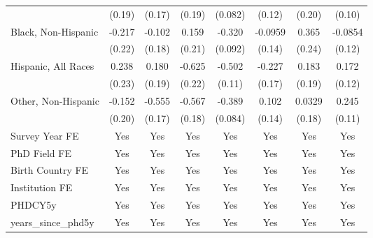 \begin{table}[htbp]
\begin{tabular}{l*{7}{c}}
  &      (0.19)         &      (0.17)         &      (0.19)         &     (0.082)         &      (0.12)         &      (0.20)         &      (0.10)         \\
[1em]
Black, Non-Hispanic&      -0.217         &      -0.102         &       0.159         &      -0.320\sym{***}&     -0.0959         &       0.365         &     -0.0854         \\
  &      (0.22)         &      (0.18)         &      (0.21)         &     (0.092)         &      (0.14)         &      (0.24)         &      (0.12)         \\
[1em]
Hispanic, All Races&       0.238         &       0.180         &      -0.625\sym{***}&      -0.502\sym{***}&      -0.227         &       0.183         &       0.172         \\
  &      (0.23)         &      (0.19)         &      (0.22)         &      (0.11)         &      (0.17)         &      (0.19)         &      (0.12)         \\
[1em]
Other, Non-Hispanic&      -0.152         &      -0.555\sym{***}&      -0.567\sym{***}&      -0.389\sym{***}&       0.102         &      0.0329         &       0.245\sym{**} \\
  &      (0.20)         &      (0.17)         &      (0.18)         &     (0.084)         &      (0.14)         &      (0.18)         &      (0.11)         \\
[1em]
Survey Year FE&         Yes         &         Yes         &         Yes         &         Yes         &         Yes         &         Yes         &         Yes         \\
[1em]
PhD Field FE&         Yes         &         Yes         &         Yes         &         Yes         &         Yes         &         Yes         &         Yes         \\
[1em]
Birth Country FE&         Yes         &         Yes         &         Yes         &         Yes         &         Yes         &         Yes         &         Yes         \\
[1em]
Institution FE&         Yes         &         Yes         &         Yes         &         Yes         &         Yes         &         Yes         &         Yes         \\
[1em]
PHDCY5y&         Yes         &         Yes         &         Yes         &         Yes         &         Yes         &         Yes         &         Yes         \\
[1em]
years\_since\_phd5y&         Yes         &         Yes         &         Yes         &         Yes         &         Yes         &         Yes         &         Yes         \\

\end{tabular}
\end{table}

